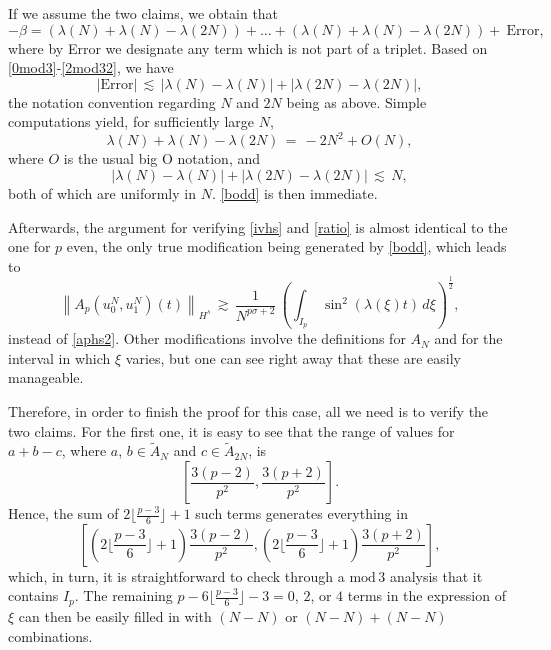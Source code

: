\documentclass{amsart}
\begin{document}
If we assume the two claims, we obtain that 
\begin{equation} 
-\beta=(\lambda(N)+\lambda(N)-\lambda(2N))+\ldots+(\lambda(N)+\lambda(N)-\lambda(2N)) + \ \text{Error},\end{equation}
where by Error we designate any term which is not part of a triplet. Based on \eqref{0mod3}-\eqref{2mod32}, we have
\begin{equation}
\left|\text{Error}\right|\,\lesssim\, \left|\lambda(N)-\lambda(N)\right| +  \left|\lambda(2N)-\lambda(2N)\right|,\end{equation}
the notation convention regarding $N$ and $2N$ being as above. Simple computations yield, for sufficiently large $N$, 
\begin{equation}
\lambda(N)+\lambda(N)-\lambda(2N)\,=\,-2N^2 + O(N),
\end{equation} 
where $O$ is the usual big O notation, and
\begin{equation}
\left|\lambda(N)-\lambda(N)\right| +  \left|\lambda(2N)-\lambda(2N)\right|\,\lesssim\, N,
\end{equation}
both of which are uniformly in $N$.  \eqref{bodd} is then immediate.

Afterwards, the argument for verifying \eqref{ivhs} and \eqref{ratio} is almost identical to the one for $p$ even, the only true modification being generated by \eqref{bodd}, which leads to 
\begin{equation}
\left\|A_{p}\left(u_0^N,u_1^N\right)(t)\right\|_{H^s}\,\gtrsim\,  \frac{1}{N^{p\sigma+2}}\, \left(\int_{I_p}\,\sin^2(\lambda(\xi)t)\,d\xi\right)^\frac{1}{2},
\label{aphs3}
\end{equation} 
instead of \eqref{aphs2}. Other modifications involve the definitions for $A_N$ and for the interval in which $\xi$ varies, but one can see right away that these are easily manageable.  

Therefore, in order to finish the proof for this case, all we need is to verify the two claims. For the first one, it  is easy to see that the range of values for $a+b-c$, where  $a$, $b \in \tilde{A}_N$ and $c \in \tilde{A}_{2N}$, is 
\[
\left[ \frac{3(p-2)}{p^2},  \frac{3(p+2)}{p^2}
\right] .
\]
Hence, the sum of $2 \lfloor\frac{p-3}{6}\rfloor +1$ such terms generates everything in
\[
\left[ \left(2 \lfloor\frac{p-3}{6}\rfloor +1\right)\frac{3(p-2)}{p^2},  \left(2 \lfloor\frac{p-3}{6}\rfloor +1\right)\frac{3(p+2)}{p^2}
\right],
\]
which, in turn, it is straightforward to check through a $\text{mod}\,3$ analysis that it contains $I_p$. The remaining $p-6 \lfloor\frac{p-3}{6}\rfloor -3=0$, $2$, or $4$ terms in the expression of $\xi$ can then be easily filled in with $(N-N)$ or $(N-N)+(N-N)$ combinations.  
\end{document}
